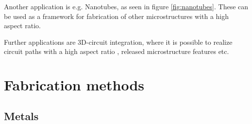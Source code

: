 \documentclass[a4paper,
  twoside, %
  headlines=2.1 %
  ]{scrartcl}
\begin{document}
Another application is e.g. Nanotubes, as seen in figure \ref{fig:nanotubes}. These can be used as a framework for fabrication of other microstructures with a high aspect ratio. \cite{hutchison2010}

Further applications are 3D-circuit integration, where it is possible to realize circuit paths with a high aspect ratio \cite{wikiDRIE}, released microstructure features etc.

\section{Fabrication methods}

\subsection{Metals}
\end{document}
